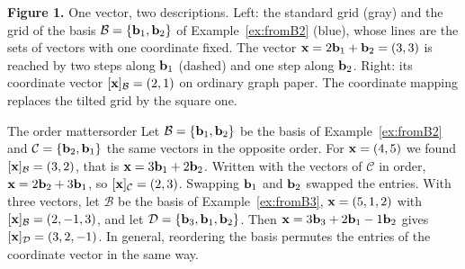 \documentclass[11pt]{article}
\begin{document}
\begin{center}
\end{center}

\textbf{Figure 1.} One vector, two descriptions. Left: the standard grid (gray) and the grid of the basis $\mathcal{B}=\{\mathbf{b}_1,\mathbf{b}_2\}$ of Example~\ref{ex:fromB2} (blue), whose lines are the sets of vectors with one coordinate fixed. The vector $\mathbf{x}=2\mathbf{b}_1+\mathbf{b}_2=(3,3)$ is reached by two steps along $\mathbf{b}_1$ (dashed) and one step along $\mathbf{b}_2$. Right: its coordinate vector $[\mathbf{x}]_{\mathcal{B}}=(2,1)$ on ordinary graph paper. The coordinate mapping replaces the tilted grid by the square one.

\begin{exmp}{The order matters}{order}
Let $\mathcal{B}=\{\mathbf{b}_1,\mathbf{b}_2\}$ be the basis of Example~\ref{ex:fromB2} and $\mathcal{C}=\{\mathbf{b}_2,\mathbf{b}_1\}$ the same vectors in the opposite order. For $\mathbf{x}=(4,5)$ we found $[\mathbf{x}]_{\mathcal{B}}=(3,2)$, that is $\mathbf{x}=3\mathbf{b}_1+2\mathbf{b}_2$. Written with the vectors of $\mathcal{C}$ in order, $\mathbf{x}=2\mathbf{b}_2+3\mathbf{b}_1$, so $[\mathbf{x}]_{\mathcal{C}}=(2,3)$. Swapping $\mathbf{b}_1$ and $\mathbf{b}_2$ swapped the entries. With three vectors, let $\mathcal{B}$ be the basis of Example~\ref{ex:fromB3}, $\mathbf{x}=(5,1,2)$ with $[\mathbf{x}]_{\mathcal{B}}=(2,-1,3)$, and let $\mathcal{D}=\{\mathbf{b}_3,\mathbf{b}_1,\mathbf{b}_2\}$. Then $\mathbf{x}=3\mathbf{b}_3+2\mathbf{b}_1-1\mathbf{b}_2$ gives $[\mathbf{x}]_{\mathcal{D}}=(3,2,-1)$. In general, reordering the basis permutes the entries of the coordinate vector in the same way.
\end{exmp}
\end{document}
